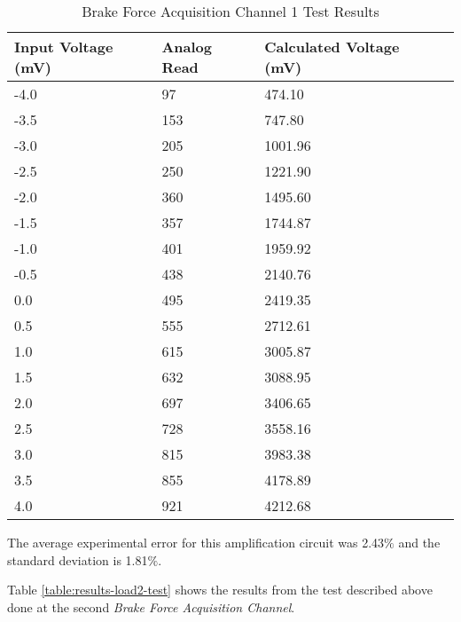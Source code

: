 				\begin{table}[h!]
				\centering
					\begin{tabular}{|l|l|l|l|}
						\hline
						\textbf{Input Voltage (mV)} & \textbf{Analog Read} & \textbf{Calculated Voltage (mV)} \\ \hline
						-4.0 & 97 &  474.10 \\ \hline
						-3.5 & 153 & 747.80 \\ \hline
						-3.0 & 205 & 1001.96 \\ \hline
						-2.5 & 250 & 1221.90 \\ \hline
						-2.0 & 360 & 1495.60 \\ \hline
						-1.5 & 357 & 1744.87 \\ \hline
						-1.0 & 401 & 1959.92 \\ \hline
						-0.5 & 438 & 2140.76 \\ \hline
						 0.0 & 495 & 2419.35 \\ \hline
						 0.5 & 555 & 2712.61 \\ \hline
						 1.0 & 615 & 3005.87 \\ \hline
						 1.5 & 632 & 3088.95 \\ \hline
						 2.0 & 697 & 3406.65 \\ \hline
						 2.5 & 728 & 3558.16 \\ \hline
						 3.0 & 815 & 3983.38 \\ \hline
						 3.5 & 855 & 4178.89 \\ \hline
						 4.0 & 921 & 4212.68 \\ \hline
					\end{tabular}
					\caption{Brake Force Acquisition Channel 1 Test Results}
					\label{table:results-load1-test}
				\end{table}

			The average experimental error for this amplification circuit was 2.43$\%$ and the standard deviation is 1.81$\%$. 


			Table \ref{table:results-load2-test} shows the results from the test described above done at the second \textit{Brake Force Acquisition Channel}.

